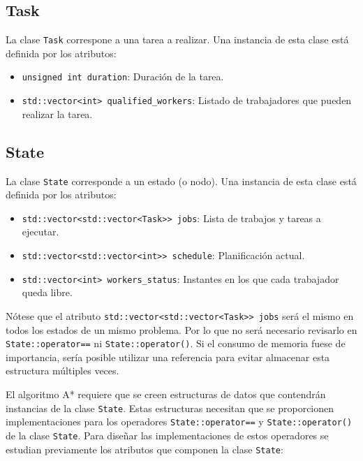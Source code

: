 \subsection{Task}

La clase \lstinline{Task} correspone a una tarea a realizar.
Una instancia de esta clase está definida por los atributos:
\begin{itemize}[itemsep=0.25px]
    \item \lstinline{unsigned int duration}: Duración de la tarea.
    \item \lstinline{std::vector<int> qualified_workers}: Listado de trabajadores que pueden realizar la tarea.
\end{itemize}

\subsection{State}

La clase \lstinline{State} corresponde a un estado (o nodo).
Una instancia de esta clase está definida por los atributos:
\begin{itemize}[itemsep=0.25px]
    \item \lstinline{std::vector<std::vector<Task>> jobs}: Lista de trabajos y tareas a ejecutar.
    \item \lstinline{std::vector<std::vector<int>> schedule}: Planificación actual.
    \item \lstinline{std::vector<int> workers_status}: Instantes en los que cada trabajador queda libre.
\end{itemize}

\begin{notebox}
    Nótese que el atributo \lstinline{std::vector<std::vector<Task>> jobs} será el mismo
    en todos los estados de un mismo problema.
    Por lo que no será necesario revisarlo en
    \lstinline{State::operator==} ni \lstinline{State::operator()}.
    Si el consumo de memoria fuese de importancia,
    sería posible utilizar una referencia para evitar
    almacenar esta estructura múltiples veces.
\end{notebox}

El algoritmo A* requiere que se creen estructuras de datos que contendrán instancias
de la clase \lstinline{State}.
Estas estructuras necesitan que se proporcionen implementaciones para los operadores
\lstinline{State::operator==} y \lstinline{State::operator()} de la clase \lstinline{State}.
Para diseñar las implementaciones de estos operadores
se estudian previamente los atributos que componen la clase \lstinline{State}:

